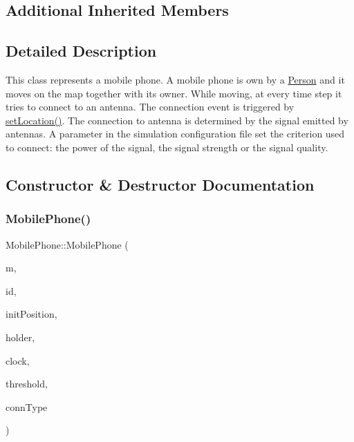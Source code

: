 \subsection*{Additional Inherited Members}


\subsection{Detailed Description}
This class represents a mobile phone. A mobile phone is own by a \hyperlink{class_person}{Person} and it moves on the map together with its owner. While moving, at every time step it tries to connect to an antenna. The connection event is triggered by \hyperlink{class_holdable_agent_aec98d2fe325b48d9a84ad3dad44700e0}{set\+Location()}. The connection to antenna is determined by the signal emitted by antennas. A parameter in the simulation configuration file set the criterion used to connect\+: the power of the signal, the signal strength or the signal quality. 

\subsection{Constructor \& Destructor Documentation}
\mbox{\label{class_mobile_phone_afd7beed70eb2af3baecd9521332ba8eb}} 
\subsubsection{\texorpdfstring{Mobile\+Phone()}{MobilePhone()}}
{\footnotesize\ttfamily Mobile\+Phone\+::\+Mobile\+Phone (\begin{DoxyParamCaption}\item[{const \hyperlink{class_map}{Map} $\ast$}]{m,  }\item[{const unsigned long}]{id,  }\item[{Point $\ast$}]{init\+Position,  }\item[{\hyperlink{class_agent}{Agent} $\ast$}]{holder,  }\item[{const \hyperlink{class_clock}{Clock} $\ast$}]{clock,  }\item[{double}]{threshold,  }\item[{\hyperlink{class_holdable_agent_ae2c334b004d7b9c5a999cf2618e4e518}{Holdable\+Agent\+::\+C\+O\+N\+N\+E\+C\+T\+I\+O\+N\+\_\+\+T\+Y\+PE}}]{conn\+Type }\end{DoxyParamCaption})\hspace{0.3cm}{\ttfamily [explicit]}}

